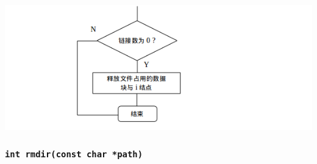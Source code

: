 \documentclass[nofonts, titlepage]{ctexart}
\begin{document}
\begin{itemize}
  \includegraphics[width=15cm]{./images/./unlink_2.png}
  \end{itemize}
  \subsubsection[\texttt{rmdir}]{\texttt{int rmdir(const char *path)}}
\end{document}
